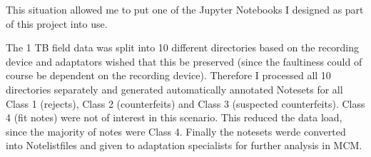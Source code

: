 This situation allowed me to put one of the Jupyter Notebooks I designed as part of this project into use.\par
The 1 TB field data was split into 10 different directories based on the recording device and adaptators wished that this be preserved (since the faultiness could of course be dependent on the recording device). Therefore I processed all 10 directories separately and generated automatically annotated Notesets for all Class 1 (rejects), Class 2 (counterfeits) and Class 3 (suspected counterfeits). Class 4 (fit notes) were not of interest in this scenario. This reduced the data load, since the majority of notes were Class 4. Finally the notesets werde converted into Notelistfiles and given to adaptation specialists for further analysis in MCM.